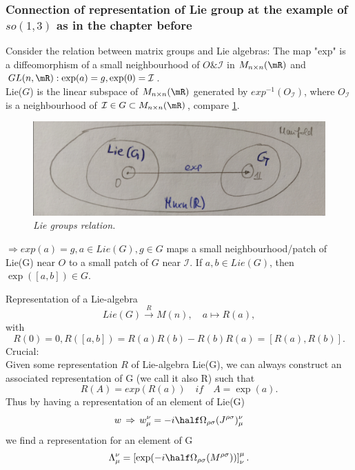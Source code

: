 \subsubsection{Connection of representation of Lie group at the example of $so(1,3)$ as in the chapter before}


Consider the relation between matrix groups and Lie algebras: The map "exp" is a diffeomorphism of a small neighbourhood of $O \& \mathcal{I}$ in $M_{n\times n}(\mR)$ and $GL(n,\mR): \exp(a)=g,\exp(0)=\mathcal{I}$.\\
Lie($G$) is the linear subspace of $M_{n\times n}(\mR)$ generated by $exp^{-1}(O_{\mathcal{I}} )$, where $O_{\mathcal{I}}$ is a neighbourhood of $\mathcal{I}\in G \subset M_{n\times n}(\mR)$, compare \ref{fig:liegroups}. 
\begin{figure}
	\centering
	\includegraphics[width=0.7\linewidth]{gfx/Liegroups}
	\caption{\itshape Lie groups relation.}
	\label{fig:liegroups}
\end{figure}
$\Rightarrow exp(a)=g, a\in Lie(G), g\in G$ maps a small neighbourhood/patch of Lie(G) near $O$ to a small patch of $G$ near $\mathcal{I}$. If $a,b \in Lie(G)$, then 
$\exp([a,b])\in G$.
\begin{mybox}{Representation of a Lie-algebra}	
	\begin{equation}
		Lie(G) \stackrel{R}{\rightarrow} M(n), \quad a\mapsto R(a),
	\end{equation}
	with
	\begin{equation}
		R(0)=0, R([a,b])=R(a)R(b) -R(b)R(a) = [R(a),R(b)].
	\end{equation}
	Crucial:\\
	Given some representation $R$ of Lie-algebra Lie(G), we can always construct an associated representation of G (we call it also R) such that
	\begin{equation}
		R(A) = exp(R(a)) \quad if\quad A=\exp(a).
	\end{equation}
	Thus by having a representation of an element of Lie(G) 
	\begin{equation}
		w \, \Rightarrow \, w^{\nu} _{\mu}= -i \half \Omega_{\rho \sigma} (J^{\rho \sigma} )^{\nu}_{\mu} 
	\end{equation}
	we find a representation for an element of G
	\begin{equation}
		\Lambda^{\nu}_{\mu} =\left[\exp(-i \half \Omega_{\rho \sigma} (M^{\rho \sigma} ))\right]^{\mu}_{\nu}.
	\end{equation}
\end{mybox}
